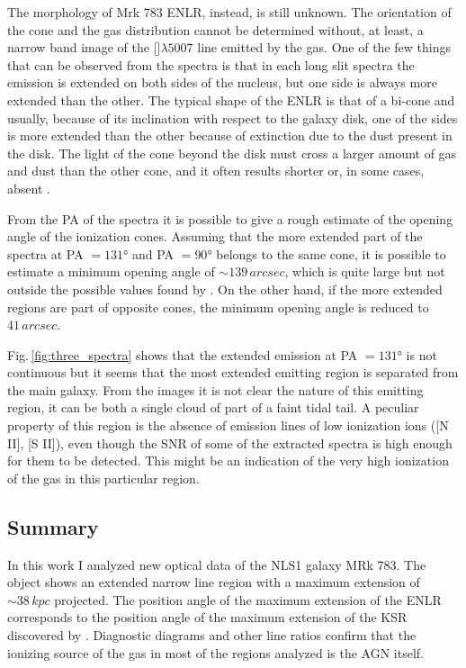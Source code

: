 \documentclass[../main.tex]{subfiles}
\begin{document}
The morphology of Mrk 783 ENLR, instead, is still unknown.
The orientation of the cone and the gas distribution cannot be determined without, at least, a narrow band image of the []$\lambda5007$ line emitted by the gas.
One of the few things that can be observed from the spectra is that in each long slit spectra the emission is extended on both sides of the nucleus, but one side is always more extended than the other.
The typical shape of the ENLR is that of a bi-cone \citep{Pogge88,Schmitt94,Fischer13} and usually, because of its inclination with respect to the galaxy disk, one of the sides is more extended than the other because of extinction due to the dust present in the disk.
The light of the cone beyond the disk must cross a larger amount of gas and dust than the other cone, and it often results shorter \citep[e.g. NGC 5643][]{Simpson97} or, in some cases, absent \citep{Wilson96}.

From the PA of the spectra it is possible to give a rough estimate of the opening angle of the ionization cones.
Assuming that the more extended part of the spectra at PA $=\ang{131}$ and PA $=\ang{90}$ belongs to the same cone, it is possible to estimate a minimum opening angle of $\sim 139\,\si{arcsec}$, which is quite large but not outside the possible values found by \citet{He18}.
On the other hand, if the more extended regions are part of opposite cones, the minimum opening angle is reduced to $41\,\si{arcsec}$.

Fig.\,\ref{fig:three_spectra} shows that the extended emission at PA $=\ang{131}$ is not continuous but it seems that the most extended emitting region is separated from the main galaxy.
From the images it is not clear the nature of this emitting region, it can be both a single cloud of part of a faint tidal tail.
A peculiar property of this region is the absence of emission lines of low ionization ions ([N II], [S II]), even though the SNR of some of the extracted spectra is high enough for them to be detected.
This might be an indication of the very high ionization of the gas in this particular region.


\subsection{Summary}
\label{sec:pap3_summary}

In this work I analyzed new optical data of the NLS1 galaxy MRk 783.
The object shows an extended narrow line region with a maximum extension of $\sim 38\,\si{kpc}$ projected.
The position angle of the maximum extension of the ENLR corresponds to the position angle of the maximum extension of the KSR discovered by \citet{Congiu17}.
Diagnostic diagrams and other line ratios confirm that the ionizing source of the gas in most of the regions analyzed is the AGN itself.
\end{document}
